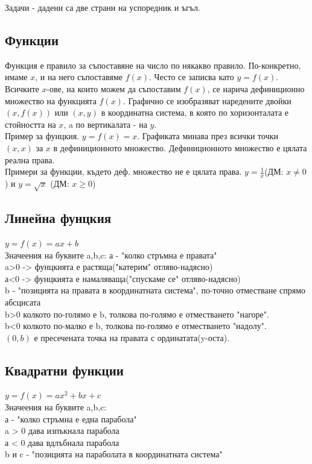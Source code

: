 \documentclass{article}
\begin{document}
Задачи - дадени са две страни на успоредник и ъгъл.

\subsection{Функции}
Функция е правило за съпоставяне на число по някакво правило. По-конкретно, имаме $x$, и на него съпоставяме $f(x)$.
Често се записва като $ y = f(x) $. Всичките $x$-ове, на които можем да съпоставим $f(x)$, се нарича дефиниционно множество на функцията $f(x)$. Графично се изобразяват наредените двойки $(x, f(x)) $ или $(x,y)$ в координатна система, в която по хоризонталата е стойността на $x$, a по вертикалата - на $y$.\\
Пример за фунцкия. $y =f(x) = x$.
Графиката минава през всички точки $(x,x)$ за $x$ в дефиниционното множество. Дефиниционното множество е цялата реална права. \\
Примери за функции, където деф. множество не е цялата права.
$y = \frac{1}{x}$(ДМ: $x \neq 0 $) и $y = \sqrt x$ (ДМ: $x \geq 0$)

\subsection{Линейна фунцкия}
$ y = f(x) = ax + b$ \\
Значеения на буквите a,b,c:
а - "колко стръмна е правата" \\
a>0 -> фунцкията е растяща("катерим" отляво-надясно) \\
а<0 -> фунцкията е намаляваща("спускаме се" отляво-надясно) \\
b - "позицията на правата в координатната система", по-точно отместване спрямо абсцисата \\
b>0 колкото по-голямо е b, толкова по-голямо е отместването "нагоре".\\
b<0 колкото по-малко е b, толкова по-голямо е отместването "надолу". \\ 
$(0,b)$ е пресечената точка на правата с ординатата(y-оста). \\

\subsection{Квадратни функции}
$ y = f(x) = ax^2 + bx + c$ \\
Значеения на буквите a,b,c: \\
а - "колко стръмна е една парабола" \\
a > 0 дава изпъкнала парабола \\
а < 0 дава вдлъбнала парабола \\
b и c - "позицията на параболата в координатната система"
\end{document}
